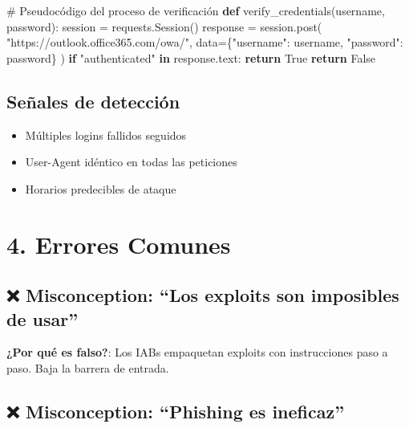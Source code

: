 \documentclass[
  letterpaper,
]{report}
\newenvironment{Shaded}{\begin{snugshade}}{\end{snugshade}}
\newcommand{\CommentTok}[1]{\textcolor[rgb]{0.37,0.37,0.37}{#1}}
\newcommand{\ControlFlowTok}[1]{\textcolor[rgb]{0.00,0.23,0.31}{\textbf{#1}}}
\newcommand{\KeywordTok}[1]{\textcolor[rgb]{0.00,0.23,0.31}{\textbf{#1}}}
\newcommand{\NormalTok}[1]{\textcolor[rgb]{0.00,0.23,0.31}{#1}}
\newcommand{\OperatorTok}[1]{\textcolor[rgb]{0.37,0.37,0.37}{#1}}
\newcommand{\StringTok}[1]{\textcolor[rgb]{0.13,0.47,0.30}{#1}}
\newcommand{\VariableTok}[1]{\textcolor[rgb]{0.07,0.07,0.07}{#1}}
\providecommand{\tightlist}{%
  \setlength{\itemsep}{0pt}\setlength{\parskip}{0pt}}
\begin{document}
\begin{Shaded}
\begin{Highlighting}[]
\CommentTok{\# Pseudocódigo del proceso de verificación}
\KeywordTok{def}\NormalTok{ verify\_credentials(username, password):}
\NormalTok{    session }\OperatorTok{=}\NormalTok{ requests.Session()}
\NormalTok{    response }\OperatorTok{=}\NormalTok{ session.post(}
        \StringTok{"https://outlook.office365.com/owa/"}\NormalTok{,}
\NormalTok{        data}\OperatorTok{=}\NormalTok{\{}\StringTok{"username"}\NormalTok{: username, }\StringTok{"password"}\NormalTok{: password\}}
\NormalTok{    )}
    \ControlFlowTok{if} \StringTok{"authenticated"} \KeywordTok{in}\NormalTok{ response.text:}
        \ControlFlowTok{return} \VariableTok{True}
    \ControlFlowTok{return} \VariableTok{False}
\end{Highlighting}
\end{Shaded}

\subsection{Señales de detección}\label{seuxf1ales-de-detecciuxf3n}

\begin{itemize}
\tightlist
\item
  Múltiples logins fallidos seguidos
\item
  User-Agent idéntico en todas las peticiones
\item
  Horarios predecibles de ataque
\end{itemize}

\section{4. Errores Comunes}\label{errores-comunes-2}

\subsection{❌ Misconception: ``Los exploits son imposibles de
usar''}\label{misconception-los-exploits-son-imposibles-de-usar}

\textbf{¿Por qué es falso?}: Los IABs empaquetan exploits con
instrucciones paso a paso. Baja la barrera de entrada.

\subsection{❌ Misconception: ``Phishing es
ineficaz''}\label{misconception-phishing-es-ineficaz}
\end{document}
